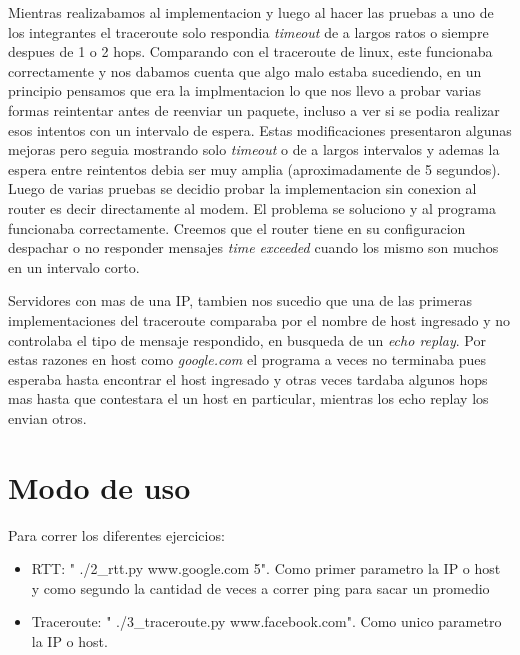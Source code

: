 \documentclass[a4paper]{article}
\begin{document}
 
 Mientras realizabamos al implementacion y luego al hacer las pruebas a uno de los integrantes el 
 traceroute  solo respondia \textit{timeout} de a largos ratos o siempre despues de 1 o 2 hops.
 Comparando con el traceroute de linux, este funcionaba correctamente y nos dabamos cuenta que algo malo estaba
 sucediendo, en un principio pensamos que era la implmentacion lo que nos llevo a probar varias formas reintentar 
 antes de reenviar un paquete, incluso a ver si se podia realizar esos intentos con un intervalo de 
 espera.
 Estas modificaciones presentaron algunas mejoras pero seguia mostrando solo \textit{timeout} o de a largos
 intervalos y ademas la espera entre reintentos debia ser muy amplia (aproximadamente de 5 segundos).
 Luego de varias pruebas se decidio probar la implementacion sin conexion al router es decir directamente
 al modem. El problema se soluciono y al programa funcionaba correctamente.
 Creemos que el router tiene en su configuracion despachar o no responder mensajes \textit{time exceeded} cuando
 los mismo son muchos en un intervalo corto.
 
 
 Servidores con mas de una IP, tambien nos sucedio que una de las primeras implementaciones del traceroute
 comparaba por el nombre de host ingresado y no controlaba el tipo de mensaje respondido, en busqueda
 de un \textit{echo replay}. Por estas razones en host como \textit{google.com} el programa a veces no 
 terminaba pues esperaba hasta encontrar el host ingresado y otras veces tardaba algunos hops mas hasta 
 que contestara el un host en particular, mientras los echo replay los envian otros.

\newpage
\section{Modo de uso}

Para correr los diferentes ejercicios:\\
\begin{itemize}
\item RTT: " ./2\_rtt.py www.google.com 5". Como primer parametro la IP o host y como segundo la cantidad de veces a correr ping para sacar un promedio
\item Traceroute: " ./3\_traceroute.py  www.facebook.com". Como unico parametro la IP o host. 
\end{itemize}
\end{document}
